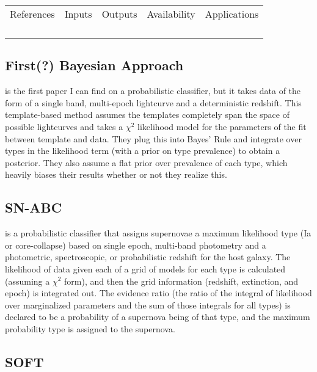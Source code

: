 \documentclass[12pt, onecolumn]{emulateapj}
\begin{document}
\begin{tabular}{ccccc}
\label{tab:comp}
References&Inputs&Outputs&Availability&Applications\\
\citet{Kuznetsova06}&&&&\\
\citet{Poznanski06}&&&&\\
\citet{Rodney09, Rodney10}&&&&\\
\citet{Sako11}&&&&\citet{Sako14}\\
\end{tabular}

\subsection{First(?) Bayesian Approach}

\citet{Kuznetsova06} is the first paper I can find on a probabilistic classifier, but it takes data of the form of a single band, multi-epoch lightcurve and a deterministic redshift.  This template-based method assumes the templates completely span the space of possible lightcurves and takes a $\chi^{2}$ likelihood model for the parameters of the fit between template and data.  They plug this into Bayes' Rule and integrate over types in the likelihood term (with a prior on type prevalence) to obtain a posterior.  They also assume a flat prior over prevalence of each type, which heavily biases their results whether or not they realize this.

\subsection{SN-ABC}

\citet{Poznanski06} is a probabilistic classifier that assigns supernovae a maximum likelihood type (Ia or core-collapse) based on single epoch, multi-band photometry and a photometric, spectroscopic, or probabilistic redshift for the host galaxy.  The likelihood of data given each of a grid of models for each type is calculated (assuming a $\chi^{2}$ form), and then the grid information (redshift, extinction, and epoch) is integrated out.  The evidence ratio (the ratio of the integral of likelihood over marginalized parameters and the sum of those integrals for all types) is declared to be a probability of a supernova being of that type, and the maximum probability type is assigned to the supernova.

\subsection{SOFT}
\end{document}
